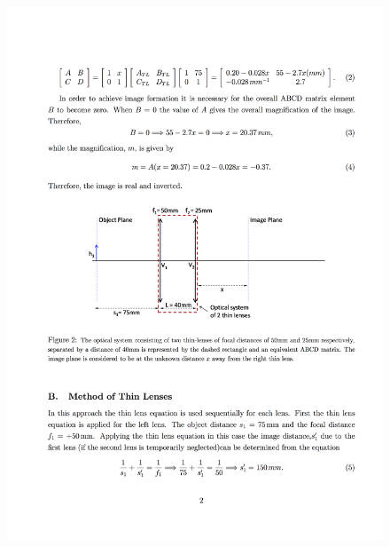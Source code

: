 \begin{figure}[h]
	
	\centering
	\includegraphics[width=1.0\linewidth]{__Images/09/Glytsis2014_2.png}
\end{figure}

